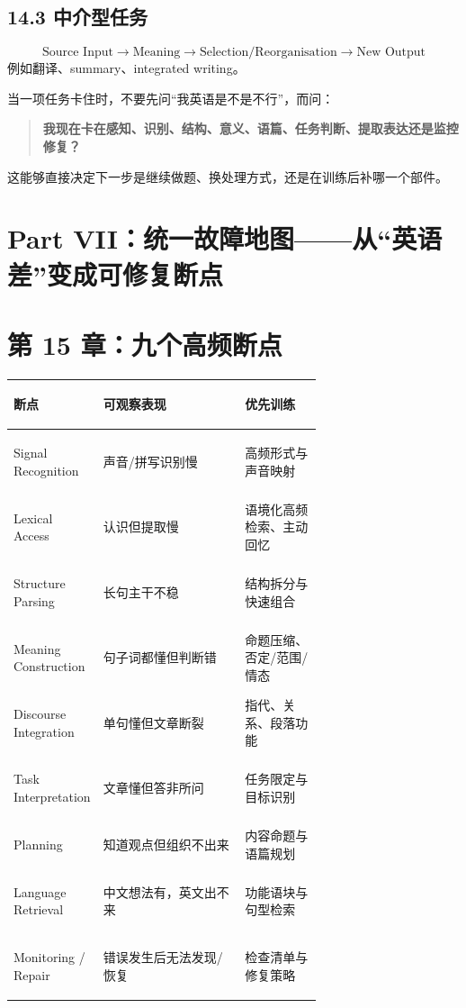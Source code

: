 \documentclass[11pt,a4paper]{ctexart}
\newcommand{\kw}[1]{\textbf{#1}}
\begin{document}
\subsection{14.3 中介型任务}
\[
\boxed{
\text{Source Input}
\rightarrow
\text{Meaning}
\rightarrow
\text{Selection/Reorganisation}
\rightarrow
\text{New Output}
}
\]
例如翻译、summary、integrated writing。

\begin{exam}[考试中最有价值的元问题]
当一项任务卡住时，不要先问“我英语是不是不行”，而问：
\begin{quote}
\kw{我现在卡在感知、识别、结构、意义、语篇、任务判断、提取表达还是监控修复？}
\end{quote}
这能够直接决定下一步是继续做题、换处理方式，还是在训练后补哪一个部件。
\end{exam}

\newpage
\section{Part VII：统一故障地图——从“英语差”变成可修复断点}

\section{第 15 章：九个高频断点}
\begin{center}
\small
\begin{tabularx}{\linewidth}{>{\bfseries\raggedright\arraybackslash}p{0.22\linewidth} >{\raggedright\arraybackslash}p{0.46\linewidth} Y}
\toprule
断点 & 可观察表现 & 优先训练 \\
\midrule
Signal Recognition & 声音/拼写识别慢 & 高频形式与声音映射 \\
Lexical Access & 认识但提取慢 & 语境化高频检索、主动回忆 \\
Structure Parsing & 长句主干不稳 & 结构拆分与快速组合 \\
Meaning Construction & 句子词都懂但判断错 & 命题压缩、否定/范围/情态 \\
Discourse Integration & 单句懂但文章断裂 & 指代、关系、段落功能 \\
Task Interpretation & 文章懂但答非所问 & 任务限定与目标识别 \\
Planning & 知道观点但组织不出来 & 内容命题与语篇规划 \\
Language Retrieval & 中文想法有，英文出不来 & 功能语块与句型检索 \\
Monitoring / Repair & 错误发生后无法发现/恢复 & 检查清单与修复策略 \\
\bottomrule
\end{tabularx}
\end{center}
\end{document}
